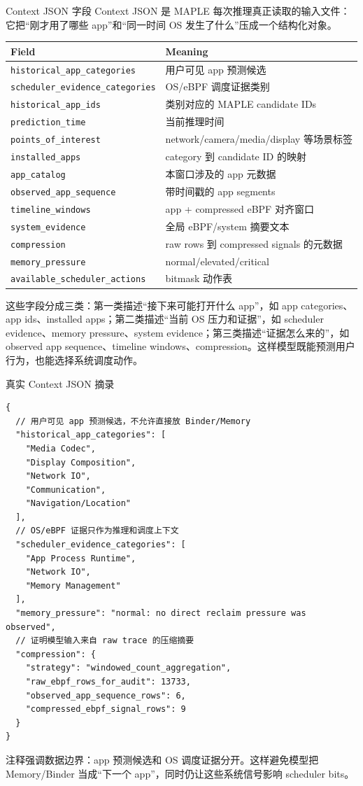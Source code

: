 \documentclass[UTF8,aspectratio=169,10pt]{ctexbeamer}
\newcommand{\code}[1]{\texttt{\small #1}}
\newcommand{\explainfoot}[1]{%
  \vspace{0.35em}
  {\scriptsize\color{memoGray}#1}
}
\begin{document}
\begin{frame}{Context JSON 字段}
  \scriptsize
  Context JSON 是 MAPLE 每次推理真正读取的输入文件：它把“刚才用了哪些 app”和“同一时间 OS 发生了什么”压成一个结构化对象。
  \vspace{0.35em}
  \begin{tabular}{ll}
    \toprule
    Field & Meaning \\
    \midrule
    \code{historical\_app\_categories} & 用户可见 app 预测候选 \\
    \code{scheduler\_evidence\_categories} & OS/eBPF 调度证据类别 \\
    \code{historical\_app\_ids} & 类别对应的 MAPLE candidate IDs \\
    \code{prediction\_time} & 当前推理时间 \\
    \code{points\_of\_interest} & network/camera/media/display 等场景标签 \\
    \code{installed\_apps} & category 到 candidate ID 的映射 \\
    \code{app\_catalog} & 本窗口涉及的 app 元数据 \\
    \code{observed\_app\_sequence} & 带时间戳的 app segments \\
    \code{timeline\_windows} & app + compressed eBPF 对齐窗口 \\
    \code{system\_evidence} & 全局 eBPF/system 摘要文本 \\
    \code{compression} & raw rows 到 compressed signals 的元数据 \\
    \code{memory\_pressure} & normal/elevated/critical \\
    \code{available\_scheduler\_actions} & bitmask 动作表 \\
    \bottomrule
  \end{tabular}
  \explainfoot{这些字段分成三类：第一类描述“接下来可能打开什么 app”，如 app categories、app ids、installed apps；第二类描述“当前 OS 压力和证据”，如 scheduler evidence、memory pressure、system evidence；第三类描述“证据怎么来的”，如 observed app sequence、timeline windows、compression。这样模型既能预测用户行为，也能选择系统调度动作。}
\end{frame}

\begin{frame}[fragile]{真实 Context JSON 摘录}
\begin{lstlisting}[basicstyle=\ttfamily\tiny]
{
  // 用户可见 app 预测候选，不允许直接放 Binder/Memory
  "historical_app_categories": [
    "Media Codec",
    "Display Composition",
    "Network IO",
    "Communication",
    "Navigation/Location"
  ],
  // OS/eBPF 证据只作为推理和调度上下文
  "scheduler_evidence_categories": [
    "App Process Runtime",
    "Network IO",
    "Memory Management"
  ],
  "memory_pressure": "normal: no direct reclaim pressure was observed",
  // 证明模型输入来自 raw trace 的压缩摘要
  "compression": {
    "strategy": "windowed_count_aggregation",
    "raw_ebpf_rows_for_audit": 13733,
    "observed_app_sequence_rows": 6,
    "compressed_ebpf_signal_rows": 9
  }
}
\end{lstlisting}
  \explainfoot{注释强调数据边界：app 预测候选和 OS 调度证据分开。这样避免模型把 Memory/Binder 当成“下一个 app”，同时仍让这些系统信号影响 scheduler bits。}
\end{frame}
\end{document}
